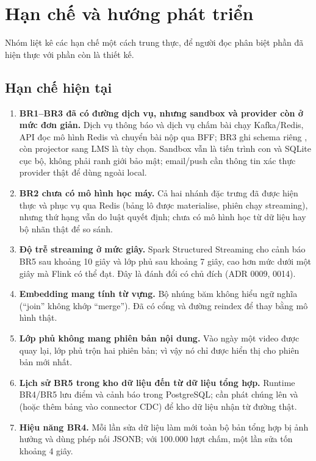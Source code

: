 \chapter{Hạn chế và hướng phát triển}
\label{chap:limits}

Nhóm liệt kê các hạn chế một cách trung thực, để người đọc phân biệt phần đã hiện thực với phần còn là thiết kế.

\section{Hạn chế hiện tại}

\begin{enumerate}
  \item \textbf{BR1--BR3 đã có đường dịch vụ, nhưng sandbox và provider còn ở mức đơn giản.} Dịch vụ thông báo và dịch vụ chấm bài chạy Kafka/Redis, API đọc mô hình Redis và chuyển bài nộp qua BFF; BR3 ghi schema riêng , còn projector sang LMS  là tùy chọn. Sandbox vẫn là tiến trình con và SQLite cục bộ, không phải ranh giới bảo mật; email/push cần thông tin xác thực provider thật để dùng ngoài local.
  \item \textbf{BR2 chưa có mô hình học máy.} Cả hai nhánh đặc trưng đã được hiện thực và phục vụ qua Redis (bảng lô được materialise, phiên chạy streaming), nhưng thứ hạng vẫn do luật quyết định; chưa có mô hình học từ dữ liệu hay bộ nhãn thật để so sánh.
  \item \textbf{Độ trễ streaming ở mức giây.} Spark Structured Streaming cho cảnh báo BR5 sau khoảng 10 giây và lớp phủ sau khoảng 7 giây, cao hơn mức dưới một giây mà Flink có thể đạt. Đây là đánh đổi có chủ đích (ADR 0009, 0014).
  \item \textbf{Embedding mang tính từ vựng.} Bộ nhúng băm không hiểu ngữ nghĩa (``join'' không khớp ``merge''). Đã có cổng  và đường reindex để thay bằng mô hình thật.
  \item \textbf{Lớp phủ không mang phiên bản nội dung.} Vào ngày một video được quay lại, lớp phủ trộn hai phiên bản; vì vậy nó chỉ được hiển thị cho phiên bản mới nhất.
  \item \textbf{Lịch sử BR5 trong kho dữ liệu đến từ dữ liệu tổng hợp.} Runtime BR4/BR5 lưu điểm và cảnh báo trong PostgreSQL; cần phát chúng lên  và  (hoặc thêm bảng vào connector CDC) để kho dữ liệu nhận từ đường thật.
  \item \textbf{Hiệu năng BR4.} Mỗi lần sửa dữ liệu làm mới toàn bộ bản tổng hợp bị ảnh hưởng và dùng phép nối JSONB; với 100.000 lượt chấm, một lần sửa tốn khoảng 4 giây.

\end{enumerate}
